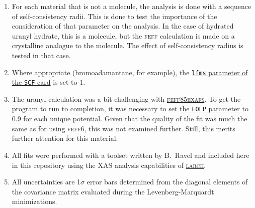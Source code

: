 \documentclass[11pt]{article}
\begin{document}
\begin{enumerate}
\item For each material that is not a molecule, the analysis is done
  with a sequence of self-consistency radii. This is done to test the
  importance of the consideration of that parameter on the analysis.
  In the case of hydrated uranyl hydrate, this is a molecule, but the
  \textsc{feff} calculation is made on a crystalline analogue to the
  molecule.  The effect of self-consistency radius is tested in that
  case.

\item Where appropriate (bromoadamantane, for example), the
  \href{http://leonardo.phys.washington.edu/feff/wiki/static/s/c/f/SCF_1ebb.html}{\texttt{lfms}
    parameter of the \texttt{SCF} card} is set to 1.

\item The uranyl calculation was a bit challenging with
  \href{https://github.com/xraypy/feff85exafs}{\textsc{feff85exafs}}. To
  get the program to run to completion, it was necessary to set
  \href{http://leonardo.phys.washington.edu/feff/wiki/static/f/o/l/FOLP_93fc.html}{the
    \texttt{FOLP} parameter} to 0.9 for each unique potential. Given that the
  quality of the fit was much the same as for using \textsc{feff6},
  this was not examined further.  Still, this merits further attention
  for this material.


\item All fits were performed with a toolset written by B.\ Ravel and
  included here in this repository using the XAS analysis capabilities
  of \href{https://github.com/xraypy/xraylarch/}{\textsc{larch}}.

\item All uncertainties are 1$\sigma$ error bars determined from the
  diagonal elements of the covariance matrix evaluated during the
  Levenberg-Marquardt minimizations.  


\end{enumerate}
\end{document}
